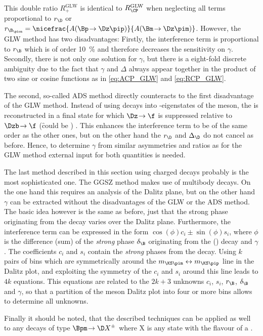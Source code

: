 This double ratio $R_{+}^{\text{GLW}}$ is identical to $R_{\CP}^{\text{GLW}}$ when neglecting all terms proportional to $r_\D$ or $r_{\B_\pion}=\nicefrac{A\!\left(\Bp\!\to\Dz\pip\right)}{A\!\left(\Bm\!\to\Dz\pim\right)}$.
However, the GLW method has two disadvantages: Firstly, the interference term is proportional to $r_\B$ which is of order \SI{10}{\percent} and therefore decreases the sensitivity on $\gamma$.
Secondly, there is not only one solution for $\gamma$, but there is a eight-fold discrete ambiguity due to the fact that $\gamma$ and $\Delta$ always appear together in the product of two sine or cosine functions as in \cref{eq:ACP_GLW} and \cref{eq:RCP_GLW}.

The second, so-called ADS method directly counteracts to the first disadvantage of the GLW method.
Instead of using decays into \CP-eigenstates of the \D meson, the \D is reconstructed in a final state for which $\Dz\!\to\f$ is suppressed relative to $\Dzb\!\to\f$ (\eg \f could be \Km\pip) \cite{ADS}.
This enhances the interference term to be of the same order as the other ones, but on the other hand the $r_\D$ and $\Delta_\D$ do not cancel as before.
Hence, to determine $\gamma$ from similar asymmetries and ratios as for the GLW method external input for both quantities is needed.

The last method described in this section using charged \B decays probably is the most sophisticated one.
The GGSZ method makes use of multibody \D decays.
On the one hand this requires an analysis of the Dalitz plane, but on the other hand $\gamma$ can be extracted without the disadvantages of the GLW or the ADS method.
The basic idea however is the same as before, just that the strong phase originating from the \D decay varies over the Dalitz plane.
Furthermore, the interference term can be expressed in the form $\cos\!\left(\phi\right)c_i\pm\sin\!\left(\phi\right)s_i$, where $\phi$ is the difference (sum) of the \emph{strong} phase $\delta_\B$ originating from the \Bm (\Bp) decay and $\gamma$.
The coefficients $c_i$ and $s_i$ contain the \emph{strong} phases from the \D decay.
Using $k$ pairs of bins which are symmetrically around the $m_{\KS\pim}\leftrightarrow m_{\KS\pip}$ line in the Dalitz plot, and exploiting the symmetry of the $c_i$ and $s_i$ around this line leads to $4k$ equations.
This equations are related to the $2k+3$ unknowns $c_i$, $s_i$, $r_\B$, $\delta_\B$ and $\gamma$, so that a partition of the \D meson Dalitz plot into four or more bins allows to determine all unknowns.

Finally it should be noted, that the described techniques can be applied as well to any decays of type $\Bpm\!\to\D X^{\pm}$ where X is any state with the flavour of a \Kpm.

